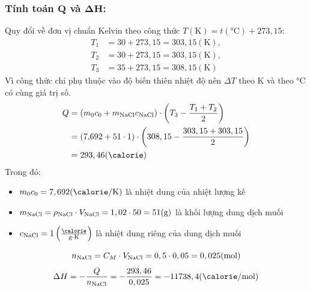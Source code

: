     \subsubsection{Tính toán \(\mathbf{Q}\) và \(\mathbf{\Delta H}\):}
        Quy đổi về đơn vị chuẩn Kelvin theo công thức \(T(\si{\kelvin}) = t(\si{\celsius}) + 273,15\):
        \begin{equation}
            \begin{aligned}
                T_1 &= 30 + 273,15 = 303,15 (\si{\kelvin}),\\
                T_2 &= 30 + 273,15 = 303,15 (\si{\kelvin}),\\
                T_3 &= 35 + 273,15 = 308,15 (\si{\kelvin})
            \end{aligned}
        \end{equation}
        Vì công thức chỉ phụ thuộc vào độ biến thiên nhiệt độ nên \(\Delta T\) theo \si{\kelvin} và theo \si{\celsius} có cùng giá trị số.
        \begin{equation}
            \begin{aligned}
                Q &= (m_0c_0 + m_{\ce{NaCl}}c_{\ce{NaCl}}) \cdot \left(T_3 - \frac{T_1+T_2}{2}\right) \\
                &= \left(7{,}692 + 51 \cdot 1\right) \cdot \left(308,15 - \frac{303,15+303,15}{2}\right) \\
                &= 293,46 (\si{\calorie})
            \end{aligned}
        \end{equation}
        Trong đó:
        \begin{itemize}
            \item \(m_0c_0 = 7,692 (\si{\calorie} / \si{\kelvin}) \) là nhiệt dung của nhiệt lượng kế
            \item \( m_{\ce{NaCl}} = \rho_{\ce{NaCl}} \cdot V_{\ce{NaCl}} = 1,02 \cdot 50 = 51 (\si{\gram}) \) là khối lượng dung dịch muối
            \item \(c_{\ce{NaCl}}=1 \left(\frac{\si{\calorie}}{\si{\gram} \cdot \si{\kelvin}} \right)\) là nhiệt dung riêng của dung dịch muối
        \end{itemize}
        \begin{equation}
            n_{\ce{NaCl}} = C_{M} \cdot V_{\ce{NaCl}} = 0,5 \cdot 0,05 = 0,025 (\si{\mole})
        \end{equation}
        \begin{equation}
            \Delta H = - \frac{Q}{n_{\ce{NaCl}}} = - \frac{293,46}{0,025} = -11738,4 (\si{\calorie} / \si{\mole})
        \end{equation}
